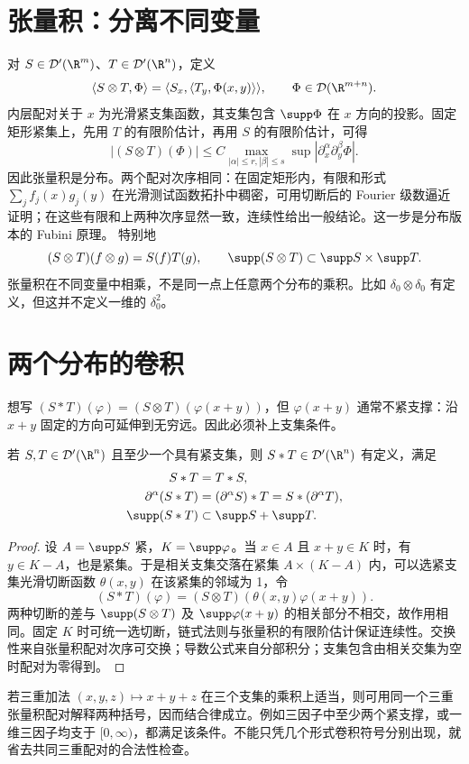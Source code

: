 \section{张量积：分离不同变量}
对 $S\in\Dist(\R^m)$、$T\in\Dist(\R^n)$，定义
\[
 \Pair{S\otimes T}{\Phi}
 =\Pair{S_x}{\Pair{T_y}{\Phi(x,y)}},
 \qquad\Phi\in\Test(\R^{m+n}).
\]
内层配对关于 $x$ 为光滑紧支集函数，其支集包含 $\supp\Phi$ 在 $x$ 方向的投影。固定矩形紧集上，先用 $T$ 的有限阶估计，再用 $S$ 的有限阶估计，可得
\[
 |(S\otimes T)(\Phi)|\le C
 \max_{|\alpha|\le r,|\beta|\le s}
 \sup|\partial_x^\alpha\partial_y^\beta\Phi|.
\]
因此张量积是分布。两个配对次序相同：在固定矩形内，有限和形式 $\sum_jf_j(x)g_j(y)$ 在光滑测试函数拓扑中稠密，可用切断后的 Fourier 级数逼近证明；在这些有限和上两种次序显然一致，连续性给出一般结论。这一步是分布版本的 Fubini 原理。
特别地
\[
 (S\otimes T)(f\otimes g)=S(f)T(g),\qquad
 \supp(S\otimes T)\subset\supp S\times\supp T.
\]
张量积在不同变量中相乘，不是同一点上任意两个分布的乘积。比如 $\delta_0\otimes\delta_0$ 有定义，但这并不定义一维的 $\delta_0^2$。

\section{两个分布的卷积}
想写 $(S*T)(\varphi)=(S\otimes T)(\varphi(x+y))$，但 $\varphi(x+y)$ 通常不紧支撑：沿 $x+y$ 固定的方向可延伸到无穷远。因此必须补上支集条件。
\begin{theorem}[一个因子紧支撑的卷积]\label{thm:compact-convolution}
若 $S,T\in\Dist(\R^n)$ 且至少一个具有紧支集，则 $S*T\in\Dist(\R^n)$ 有定义，满足
\begin{align*}
 S*T&=T*S,\\
 \partial^\alpha(S*T)&=(\partial^\alpha S)*T=S*(\partial^\alpha T),\\
 \supp(S*T)&\subset\supp S+\supp T.
\end{align*}
\end{theorem}
\begin{proof}
设 $A=\supp S$ 紧，$K=\supp\varphi$。当 $x\in A$ 且 $x+y\in K$ 时，有 $y\in K-A$，也是紧集。于是相关支集交落在紧集 $A\times(K-A)$ 内，可以选紧支集光滑切断函数 $\theta(x,y)$ 在该紧集的邻域为 1，令
\[
 (S*T)(\varphi)=(S\otimes T)(\theta(x,y)\varphi(x+y)).
\]
两种切断的差与 $\supp(S\otimes T)$ 及 $\supp\varphi(x+y)$ 的相关部分不相交，故作用相同。固定 $K$ 时可统一选切断，链式法则与张量积的有限阶估计保证连续性。交换性来自张量积配对次序可交换；导数公式来自分部积分；支集包含由相关交集为空时配对为零得到。
\end{proof}
若三重加法 $(x,y,z)\mapsto x+y+z$ 在三个支集的乘积上适当，则可用同一个三重张量积配对解释两种括号，因而结合律成立。例如三因子中至少两个紧支撑，或一维三因子均支于 $[0,\infty)$，都满足该条件。不能只凭几个形式卷积符号分别出现，就省去共同三重配对的合法性检查。

